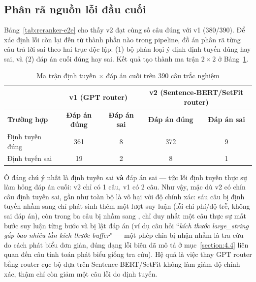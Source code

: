 \documentclass[../DoAn.tex]{subfiles}
\begin{document}
\subsection{Phân rã nguồn lỗi đầu cuối}
\label{subsection:4.2.6}

Bảng~\ref{tab:reranker-e2e} cho thấy v2 đạt cùng số câu đúng với v1 (380/390). Để xác định lỗi còn lại đến từ thành phần nào trong pipeline, đồ án phân rã từng câu trả lời sai theo hai trục độc lập: (1) bộ phân loại ý định định tuyến đúng hay sai, và (2) đáp án cuối đúng hay sai. Kết quả tạo thành ma trận $2\times2$ ở Bảng~\ref{tab:e2e-confusion}.

\begin{table}[H]
    \centering
    \caption{Ma trận định tuyến $\times$ đáp án cuối trên 390 câu trắc nghiệm}
    \label{tab:e2e-confusion}
    {\small
    \setlength{\tabcolsep}{5pt}
    \begin{tabular}{|>{\raggedright\arraybackslash}p{3.0cm}|c|c|c|c|}
        \hline
        & \multicolumn{2}{c|}{\textbf{v1 (GPT router)}} & \multicolumn{2}{c|}{\textbf{v2 (Sentence-BERT/SetFit router)}} \\ \cline{2-5}
        \textbf{Trường hợp} & \textbf{Đáp án đúng} & \textbf{Đáp án sai} & \textbf{Đáp án đúng} & \textbf{Đáp án sai} \\ \hline
        Định tuyến đúng & 361 & 8 & 372 & 9 \\ \hline
        Định tuyến sai & 19 & 2 & 8 & 1 \\ \hline
    \end{tabular}
    }
\end{table}

Ô đáng chú ý nhất là định tuyến sai \textbf{và} đáp án sai --- tức lỗi định tuyến thực sự làm hỏng đáp án cuối: v2 chỉ có 1 câu, v1 có 2 câu. Như vậy, mặc dù v2 có chín câu định tuyến sai, gần như toàn bộ là vô hại với độ chính xác: sáu câu  bị định tuyến nhầm sang  chỉ phát sinh thêm một lượt suy luận (lỗi chi phí/độ trễ, không sai đáp án), còn trong ba câu  bị nhầm sang , chỉ duy nhất một câu thực sự mất bước suy luận từng bước và bị lật đáp án (ví dụ câu hỏi ``\textit{kích thước large\_string gấp bao nhiêu lần kích thước buffer}'' --- một phép chia bị nhận nhầm là tra cứu do cách phát biểu đơn giản, đúng dạng lỗi biên đã mô tả ở mục~\ref{section:4.4} liên quan đến câu tính toán phát biểu giống tra cứu). Hệ quả là việc thay GPT router bằng router cục bộ dựa trên Sentence-BERT/SetFit không làm giảm độ chính xác, thậm chí còn giảm một câu lỗi do định tuyến.
\end{document}
